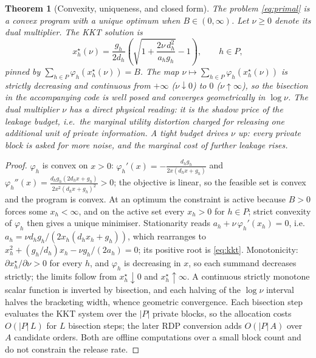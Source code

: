 \documentclass[10pt,twocolumn,letterpaper]{article}
\theoremstyle{plain}
\newtheorem{theorem}{Theorem}
\theoremstyle{definition}
\begin{document}
\begin{theorem}[Convexity, uniqueness, and closed form]
\label{th:allocation}
The problem \eqref{eq:primal} is a convex program with a unique optimum when
$B\in(0,\infty)$. Let $\nu\ge0$ denote its dual multiplier. The KKT solution is
\begin{equation}
x_h^{\star}(\nu)=\frac{g_h}{2d_h}\left(
\sqrt{1+\frac{2\nu\,d_h^{2}}{a_h g_h}}-1\right),\qquad h\in P,
\label{eq:kkt}
\end{equation}
pinned by $\sum_{h\in P}\varphi_h(x_h^\star(\nu))=B$. The map
$\nu\mapsto\sum_{h\in P}\varphi_h(x_h^\star(\nu))$ is strictly decreasing and
continuous from $+\infty$ ($\nu\downarrow0$) to $0$ ($\nu\uparrow\infty$), so
the bisection in the accompanying code is well posed and converges
geometrically in $\log\nu$. The dual multiplier $\nu$ has a direct physical
reading: it is the shadow price of the leakage budget, i.e.\ the marginal
utility distortion charged for releasing one additional unit of private
information. A tight budget drives $\nu$ up: every private block is asked for
more noise, and the marginal cost of further leakage rises.
\end{theorem}

\begin{proof}
$\varphi_h$ is convex on $x>0$:
$\varphi_h'(x)=-\frac{d_hg_h}{2x(d_hx+g_h)}$ and
$\varphi_h''(x)=\frac{d_hg_h(2d_hx+g_h)}{2x^2(d_hx+g_h)^2}>0$; the objective is
linear, so the feasible set is convex and the program is convex. At an optimum
the constraint is active because $B>0$ forces some $x_h<\infty$, and on the
active set every $x_h>0$ for $h\in P$; strict convexity of $\varphi_h$ then
gives a unique minimiser. Stationarity reads
$a_h+\nu\,\varphi_h'(x_h)=0$, i.e.
$a_h=\nu d_hg_h/(2x_h(d_hx_h+g_h))$, which rearranges to
$x_h^2+(g_h/d_h)x_h-\nu g_h/(2a_h)=0$; its positive root is \eqref{eq:kkt}.
Monotonicity: $\partial x_h^\star/\partial\nu>0$ for every $h$, and
$\varphi_h$ is decreasing in $x$, so each summand decreases strictly; the
limits follow from $x_h^\star\downarrow0$ and $x_h^\star\uparrow\infty$. A
continuous strictly monotone scalar function is inverted by bisection, and
each halving of the $\log\nu$ interval halves the bracketing width, whence
geometric convergence. Each bisection step evaluates the KKT system over the
$|P|$ private blocks, so the allocation costs $O(|P|\,L)$ for $L$ bisection
steps; the later RDP conversion adds $O(|P|\,A)$ over $A$ candidate orders.
Both are offline computations over a small block count and do not constrain the
release rate.
\end{proof}
\end{document}
